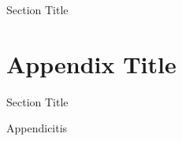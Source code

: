 \documentclass[oneside,12pt,final]{sty/ucthesis-CA2012}
\begin{document}
\begin{mainmatter}
\begin{section}{Section Title}
\end{section}



\appendix

\dsp

\chapter{Appendix Title }{\label{appendix:a}}
\begin{section}{Section Title}

Appendicitis

\end{section}
\end{mainmatter}

\ssp


\end{document}
